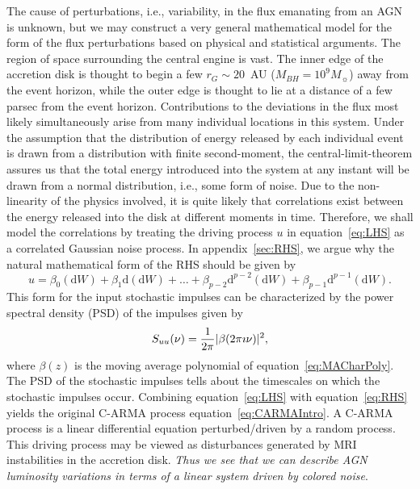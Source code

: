 \documentclass[a4paper,fleqn,usenatbib]{mnras}
\begin{document}
The cause of perturbations, i.e., variability, in the flux emanating from an AGN is unknown, but we may construct a very general mathematical model for the form of the flux perturbations based on physical and statistical arguments. The region of space surrounding the central engine is vast. The inner edge of the accretion disk is thought to begin a few $r_{G} \sim 20$~AU ($M_{BH} = 10^{9} M_{\sun}$) away from the event horizon, while the outer edge is thought to lie at a distance of a few parsec from the event horizon. Contributions to the deviations in the flux most likely simultaneously arise from many individual locations in this system. Under the assumption that the distribution of energy released by each individual event is drawn from a distribution with finite second-moment, the central-limit-theorem assures us that the total energy introduced into the system at any instant will be drawn from a normal distribution, i.e., some form of noise. Due to the non-linearity of the physics involved, it is quite likely that correlations exist between the energy released into the disk at different moments in time. Therefore, we shall model the correlations by treating the driving process $u$ in equation~\eqref{eq:LHS} as a correlated Gaussian noise process. In appendix~\ref{sec:RHS}, we argue why the natural mathematical form of the RHS should be given by
\begin{equation}\label{eq:RHS}
u = \beta_{0} (\mathrm{d}W) + \beta_{1} \mathrm{d}(\mathrm{d}W) + \ldots + \beta_{p-2} \mathrm{d}^{p-2}(\mathrm{d}W) + \beta_{p-1} \mathrm{d}^{p-1}(\mathrm{d}W).
\end{equation}
This form for the input stochastic impulses can be characterized by the power spectral density (PSD) of the impulses given by
\begin{equation}\label{eq:ImpulsePSD}
S_{uu}(\nu) = \frac{1}{2 \pi } |\beta(2 \pi \imath \nu)|^{2},
\end{equation}
where $\beta(z)$ is the moving average polynomial of equation~\eqref{eq:MACharPoly}. The PSD of the stochastic impulses tells about the timescales on which the stochastic impulses occur. Combining equation~\eqref{eq:LHS} with equation~\eqref{eq:RHS} yields the original C-ARMA process equation~\eqref{eq:CARMAIntro}. A C-ARMA process is a linear differential equation perturbed/driven by a random process. This driving process may be viewed as disturbances generated by MRI instabilities in the accretion disk. \textit{Thus we see that we can describe AGN luminosity variations in terms of a linear system driven by colored noise}. 
\end{document}
